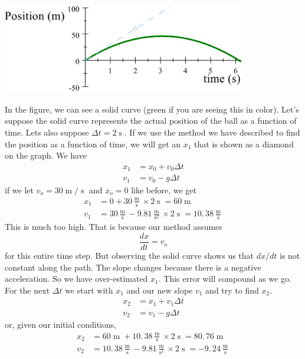 \documentclass[twoside,11pt,ShortChapTitles]{BYUTextbook}
\begin{document}
 
\begin{center}
\includegraphics[width=0.8\textwidth]{Lab7_figs/PvTOnePoint.png}
\end{center}
In the figure, we can see a solid curve (green if you are seeing this in
color). Let's suppose the solid curve represents the actual position of the
ball as a function of time. Lets also suppose $\Delta t=2 \operatorname{s} .$ If we use the method we have described to find the position as a function
of time, we will get an $x_{1}$ that is shown as a diamond on the graph. We
have
\begin{align*}
x_{1}  & =x_{0}+v_{0}\Delta t\\
v_{1}  & =v_{0}-g\Delta t
\end{align*}
if we let $v_{o}=30 \operatorname{m} / \operatorname{s} $ and $x_{o}=0$ like before, we get
\begin{align*}
x_{1}  & =0+30\frac{ \operatorname{m} }{ \operatorname{s} }\times2 \operatorname{s} =60 \operatorname{m} \\
v_{1}  & =30\frac{ \operatorname{m} }{ \operatorname{s} }-9.81\frac{ \operatorname{m} }{ \operatorname{s} ^{2}}\times2 \operatorname{s} =\allowbreak10.\,\allowbreak38\frac{ \operatorname{m} }{ \operatorname{s} } \end{align*}
This is much too high. That is because our method assumes \[
\frac{dx}{dt}=v_{o}
\]
for this entire time step. But observing the solid curve shows us that $dx/dt
$ is not constant along the path. The slope changes because there is a
negative acceleration. So we have over-estimated $x_{1}.$ This error will
compound as we go. For the next $\Delta t$ we start with $x_{1}$ and our new
slope $v_{1}$ and try to find $x_{2}.$
\begin{align*}
x_{2}  & =x_{1}+v_{1}\Delta t\\
v_{2}  & =v_{1}-g\Delta t
\end{align*}
or, given our initial conditions, \begin{align*}
x_{2}  & =60 \operatorname{m} +\allowbreak10.\,\allowbreak38\frac{ \operatorname{m} }{ \operatorname{s} }\times2 \operatorname{s} =\allowbreak80.\,\allowbreak76 \operatorname{m} \\
v_{2}  & =\allowbreak10.\,\allowbreak38\frac{ \operatorname{m} }{ \operatorname{s} }-9.81\frac{ \operatorname{m} }{ \operatorname{s} ^{2}}\times2 \operatorname{s} =\allowbreak-9.\,\allowbreak24\frac{ \operatorname{m} }{ \operatorname{s} } \end{align*} 
\end{document}
